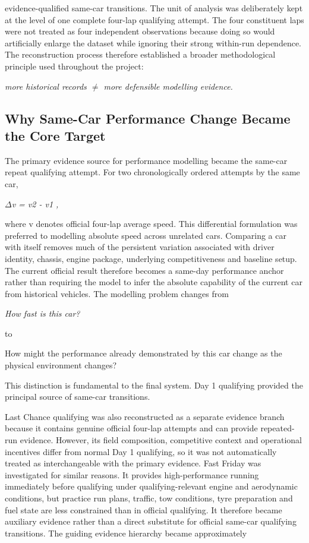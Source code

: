 evidence-qualified same-car transitions. The unit of analysis was deliberately kept at the level of one complete four-lap qualifying attempt. The four constituent laps were not treated as four independent observations because doing so would artificially enlarge the dataset while ignoring their strong within-run dependence. The reconstruction process therefore established a broader methodological principle used throughout the project:

\begin{center}\textit{more historical records \ensuremath{\neq} more defensible modelling evidence.}\end{center}

\subsection{Why Same-Car Performance Change Became the Core Target}
The primary evidence source for performance modelling became the same-car repeat qualifying attempt. For two chronologically ordered attempts by the same car,

\begin{center}\textit{\ensuremath{\Delta}v = v2 - v1 ,}\end{center}

where v denotes official four-lap average speed. This differential formulation was preferred to modelling absolute speed across unrelated cars. Comparing a car with itself removes much of the persistent variation associated with driver identity, chassis, engine package, underlying competitiveness and baseline setup. The current official result therefore becomes a same-day performance anchor rather than requiring the model to infer the absolute capability of the current car from historical vehicles. The modelling problem changes from

\begin{center}\textit{How fast is this car?}\end{center}

to

How might the performance already demonstrated by this car change as the physical environment changes?

This distinction is fundamental to the final system. Day 1 qualifying provided the principal source of same-car transitions.

Last Chance qualifying was also reconstructed as a separate evidence branch because it contains genuine official four-lap attempts and can provide repeated-run evidence. However, its field composition, competitive context and operational incentives differ from normal Day 1 qualifying, so it was not automatically treated as interchangeable with the primary evidence. Fast Friday was investigated for similar reasons. It provides high-performance running immediately before qualifying under qualifying-relevant engine and aerodynamic conditions, but practice run plans, traffic, tow conditions, tyre preparation and fuel state are less constrained than in official qualifying. It therefore became auxiliary evidence rather than a direct substitute for official same-car qualifying transitions. The guiding evidence hierarchy became approximately

